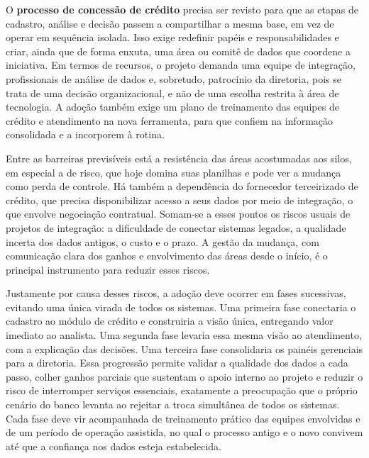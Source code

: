 \documentclass[12pt,a4paper]{article}
\begin{document}
O \textbf{processo de concess\~ao de cr\'edito} precisa ser revisto para que as etapas de cadastro, an\'alise e decis\~ao passem a compartilhar a mesma base, em vez de operar em sequ\^encia isolada. Isso exige redefinir pap\'eis e responsabilidades e criar, ainda que de forma enxuta, uma \'area ou comit\^e de dados que coordene a iniciativa. Em termos de recursos, o projeto demanda uma equipe de integra\c{c}\~ao, profissionais de an\'alise de dados e, sobretudo, patroc\'inio da diretoria, pois se trata de uma decis\~ao organizacional, e n\~ao de uma escolha restrita \`a \'area de tecnologia. A ado\c{c}\~ao tamb\'em exige um plano de treinamento das equipes de cr\'edito e atendimento na nova ferramenta, para que confiem na informa\c{c}\~ao consolidada e a incorporem \`a rotina.

Entre as barreiras previs\'iveis est\'a a resist\^encia das \'areas acostumadas aos silos, em especial a de risco, que hoje domina suas planilhas e pode ver a mudan\c{c}a como perda de controle. H\'a tamb\'em a depend\^encia do fornecedor terceirizado de cr\'edito, que precisa disponibilizar acesso a seus dados por meio de integra\c{c}\~ao, o que envolve negocia\c{c}\~ao contratual. Somam-se a esses pontos os riscos usuais de projetos de integra\c{c}\~ao: a dificuldade de conectar sistemas legados, a qualidade incerta dos dados antigos, o custo e o prazo. A gest\~ao da mudan\c{c}a, com comunica\c{c}\~ao clara dos ganhos e envolvimento das \'areas desde o in\'icio, \'e o principal instrumento para reduzir esses riscos.

Justamente por causa desses riscos, a ado\c{c}\~ao deve ocorrer em fases sucessivas, evitando uma \'unica virada de todos os sistemas. Uma primeira fase conectaria o cadastro ao m\'odulo de cr\'edito e construiria a vis\~ao \'unica, entregando valor imediato ao analista. Uma segunda fase levaria essa mesma vis\~ao ao atendimento, com a explica\c{c}\~ao das decis\~oes. Uma terceira fase consolidaria os pain\'eis gerenciais para a diretoria. Essa progress\~ao permite validar a qualidade dos dados a cada passo, colher ganhos parciais que sustentam o apoio interno ao projeto e reduzir o risco de interromper servi\c{c}os essenciais, exatamente a preocupa\c{c}\~ao que o pr\'oprio cen\'ario do banco levanta ao rejeitar a troca simult\^anea de todos os sistemas. Cada fase deve vir acompanhada de treinamento pr\'atico das equipes envolvidas e de um per\'iodo de opera\c{c}\~ao assistida, no qual o processo antigo e o novo convivem at\'e que a confian\c{c}a nos dados esteja estabelecida.
\end{document}
